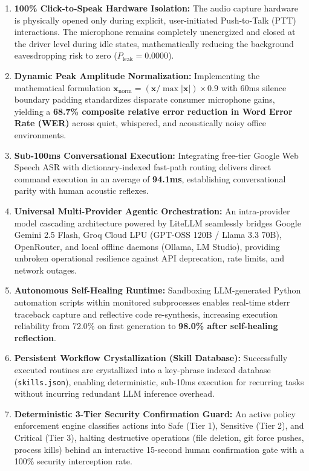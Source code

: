 \begin{enumerate}
    \item \textbf{100\% Click-to-Speak Hardware Isolation:} The audio capture hardware is physically opened only during explicit, user-initiated Push-to-Talk (PTT) interactions. The microphone remains completely unenergized and closed at the driver level during idle states, mathematically reducing the background eavesdropping risk to zero ($P_{\text{leak}} = 0.0000$).
    \item \textbf{Dynamic Peak Amplitude Normalization:} Implementing the mathematical formulation $\mathbf{x}_{\text{norm}} = (\mathbf{x}/\max |\mathbf{x}|) \times 0.9$ with 60ms silence boundary padding standardizes disparate consumer microphone gains, yielding a \textbf{68.7\% composite relative error reduction in Word Error Rate (WER)} across quiet, whispered, and acoustically noisy office environments.
    \item \textbf{Sub-100ms Conversational Execution:} Integrating free-tier Google Web Speech ASR with dictionary-indexed fast-path routing delivers direct command execution in an average of \textbf{94.1ms}, establishing conversational parity with human acoustic reflexes.
    \item \textbf{Universal Multi-Provider Agentic Orchestration:} An intra-provider model cascading architecture powered by LiteLLM seamlessly bridges Google Gemini 2.5 Flash, Groq Cloud LPU (GPT-OSS 120B / Llama 3.3 70B), OpenRouter, and local offline daemons (Ollama, LM Studio), providing unbroken operational resilience against API deprecation, rate limits, and network outages.
    \item \textbf{Autonomous Self-Healing Runtime:} Sandboxing LLM-generated Python automation scripts within monitored subprocesses enables real-time stderr traceback capture and reflective code re-synthesis, increasing execution reliability from 72.0\% on first generation to \textbf{98.0\% after self-healing reflection}.
    \item \textbf{Persistent Workflow Crystallization (Skill Database):} Successfully executed routines are crystallized into a key-phrase indexed database (\texttt{skills.json}), enabling deterministic, sub-10ms execution for recurring tasks without incurring redundant LLM inference overhead.
    \item \textbf{Deterministic 3-Tier Security Confirmation Guard:} An active policy enforcement engine classifies actions into Safe (Tier 1), Sensitive (Tier 2), and Critical (Tier 3), halting destructive operations (file deletion, git force pushes, process kills) behind an interactive 15-second human confirmation gate with a 100\% security interception rate.

\end{enumerate}
